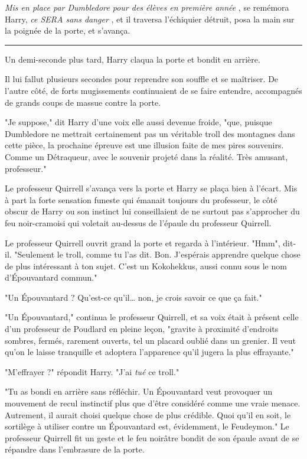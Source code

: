 \emph{Mis en place par Dumbledore pour des élèves en première année} , se remémora Harry, \emph{ce SERA sans danger} , et il traversa l'échiquier détruit, posa la main sur la poignée de la porte, et s'avança.
\par\noindent\rule{\textwidth}{0.4pt}
Un demi-seconde plus tard, Harry claqua la porte et bondit en arrière.

Il lui fallut plusieurs secondes pour reprendre son souffle et se maîtriser. De l'autre côté, de forts mugissements continuaient de se faire entendre, accompagnés de grands coups de massue contre la porte.

"Je suppose," dit Harry d'une voix elle aussi devenue froide, "que, puisque Dumbledore ne mettrait certainement pas un véritable troll des montagnes dans cette pièce, la prochaine épreuve est une illusion faite de mes pires souvenirs. Comme un Détraqueur, avec le souvenir projeté dans la réalité. Très amusant, professeur."

Le professeur Quirrell s'avança vers la porte et Harry se plaça bien à l'écart. Mis à part la forte sensation funeste qui émanait toujours du professeur, le côté obscur de Harry ou son instinct lui conseillaient de ne surtout pas s'approcher du feu noir-cramoisi qui voletait au-dessus de l'épaule du professeur Quirrell.

Le professeur Quirrell ouvrit grand la porte et regarda à l'intérieur. "Hmm", dit-il. "Seulement le troll, comme tu l'as dit. Bon. J'espérais apprendre quelque chose de plus intéressant à ton sujet. C'est un Kokohekkus, aussi connu sous le nom d'Épouvantard commun."

"Un Épouvantard ? Qu'est-ce qu'il… non, je crois savoir ce que ça fait."

"Un Épouvantard," continua le professeur Quirrell, et sa voix était à présent celle d'un professeur de Poudlard en pleine leçon, "gravite à proximité d'endroits sombres, fermés, rarement ouverts, tel un placard oublié dans un grenier. Il veut qu'on le laisse tranquille et adoptera l'apparence qu'il jugera la plus effrayante."

"M'effrayer ?" répondit Harry. "J'ai \emph{tué}  ce troll."

"Tu as bondi en arrière sans réfléchir. Un Épouvantard veut provoquer un mouvement de recul instinctif plus que d'être considéré comme une vraie menace. Autrement, il aurait choisi quelque chose de plus crédible. Quoi qu'il en soit, le sortilège à utiliser contre un Épouvantard est, évidemment, le Feudeymon." Le professeur Quirrell fit un geste et le feu noirâtre bondit de son épaule avant de se répandre dans l'embrasure de la porte.

